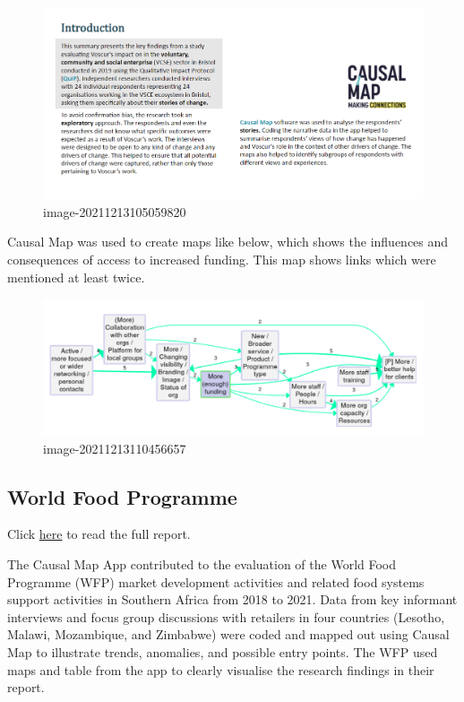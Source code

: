 \documentclass[
]{book}
\begin{document}
\begin{figure}
\centering
\includegraphics[width=6.77083in,height=\textheight]{_assets/image-20211213105059820.png}
\caption{image-20211213105059820}
\end{figure}

Causal Map was used to create maps like below, which shows the influences and consequences of access to increased funding. This map shows links which were mentioned at least twice.

\begin{figure}
\centering
\includegraphics[width=6.77083in,height=\textheight]{_assets/image-20211213110456657.png}
\caption{image-20211213110456657}
\end{figure}

\hypertarget{world-food-programme}{%
\subsection{World Food Programme}\label{world-food-programme}}

Click \href{https://www.wfp.org/publications/wfp-contribution-market-development-and-food-systems-southern-africa-thematic}{here} to read the full report.

The Causal Map App contributed to the evaluation of the World Food Programme (WFP) market development activities and related food systems support activities in Southern Africa from 2018 to 2021. Data from key informant interviews and focus group discussions with retailers in four countries (Lesotho, Malawi, Mozambique, and Zimbabwe) were coded and mapped out using Causal Map to illustrate trends, anomalies, and possible entry points. The WFP used maps and table from the app to clearly visualise the research findings in their report.
\end{document}
